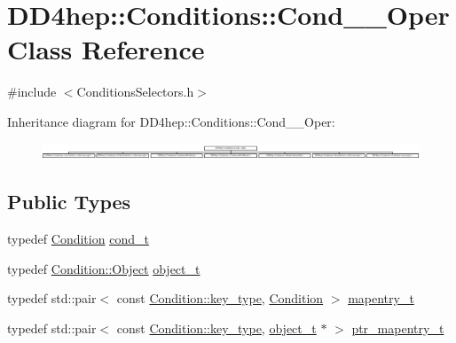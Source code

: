 \hypertarget{class_d_d4hep_1_1_conditions_1_1_cond_____oper}{}\section{D\+D4hep\+:\+:Conditions\+:\+:Cond\+\_\+\+\_\+\+Oper Class Reference}
\label{class_d_d4hep_1_1_conditions_1_1_cond_____oper}


{\ttfamily \#include $<$Conditions\+Selectors.\+h$>$}

Inheritance diagram for D\+D4hep\+:\+:Conditions\+:\+:Cond\+\_\+\+\_\+\+Oper\+:\begin{figure}[H]
\begin{center}
\leavevmode
\includegraphics[height=0.474777cm]{class_d_d4hep_1_1_conditions_1_1_cond_____oper}
\end{center}
\end{figure}
\subsection*{Public Types}
\begin{DoxyCompactItemize}
\item 
typedef \hyperlink{class_d_d4hep_1_1_conditions_1_1_condition}{Condition} \hyperlink{class_d_d4hep_1_1_conditions_1_1_cond_____oper_aceca9f6a0e8c84364946eace47275d09}{cond\+\_\+t}
\item 
typedef \hyperlink{class_d_d4hep_1_1_conditions_1_1_condition_a6fc8dae0dad41db6a237920c85f8a55d}{Condition\+::\+Object} \hyperlink{class_d_d4hep_1_1_conditions_1_1_cond_____oper_a4229491e49bfd21058dff10125a73f63}{object\+\_\+t}
\item 
typedef std\+::pair$<$ const \hyperlink{class_d_d4hep_1_1_conditions_1_1_condition_a7528efa762e8cc072ef80ea67c3531f9}{Condition\+::key\+\_\+type}, \hyperlink{class_d_d4hep_1_1_conditions_1_1_condition}{Condition} $>$ \hyperlink{class_d_d4hep_1_1_conditions_1_1_cond_____oper_a877dac3da66795207aed15be219acbdc}{mapentry\+\_\+t}
\item 
typedef std\+::pair$<$ const \hyperlink{class_d_d4hep_1_1_conditions_1_1_condition_a7528efa762e8cc072ef80ea67c3531f9}{Condition\+::key\+\_\+type}, \hyperlink{class_d_d4hep_1_1_conditions_1_1_cond_____oper_a4229491e49bfd21058dff10125a73f63}{object\+\_\+t} $\ast$ $>$ \hyperlink{class_d_d4hep_1_1_conditions_1_1_cond_____oper_a0949e4bd5f90cd3fae2394cf30983973}{ptr\+\_\+mapentry\+\_\+t}
\end{DoxyCompactItemize}


